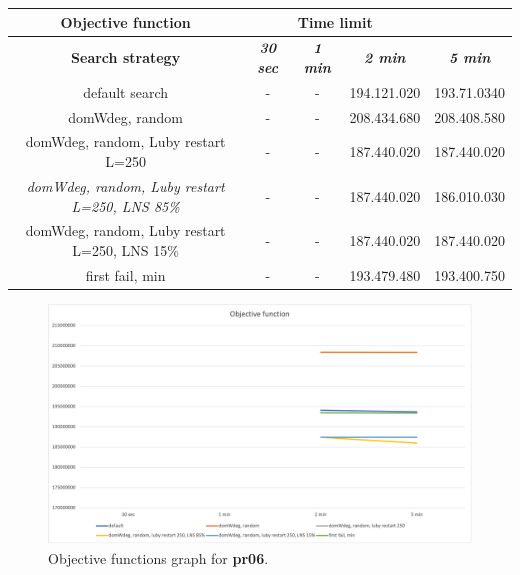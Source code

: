 {
\renewcommand{\arraystretch}{2}
\begin{longtable}[h]{| c | c | c | c | c |}
    \hline
    \textbf{Objective function} & \multicolumn{3}{c}{Time limit} & \\
    \hline
    \textbf{Search strategy} & \textbf{\textit{30 sec}} & \textbf{\textit{1 min}} & \textbf{\textit{2 min}} & \textbf{\textit{5 min}} \\
    \hline
    \endhead
    default search                                         & - & - & 194.121.020 & 193.71.0340 \\
    \hline
    domWdeg, random                                        & - & - & 208.434.680 & 208.408.580 \\
    \hline
    domWdeg, random, Luby restart L=250                    & - & - & 187.440.020 & 187.440.020 \\
    \hline
    \textit{domWdeg, random, Luby restart L=250, LNS 85\%} & - & - & 187.440.020 & 186.010.030 \\
    \hline
    domWdeg, random, Luby restart L=250, LNS 15\%          & - & - & 187.440.020 & 187.440.020 \\
    \hline
    first fail, min                                        & - & - & 193.479.480 & 193.400.750 \\
    \hline
\end{longtable}
}
\begin{figure}[H]
    \centering
    \includegraphics[width=0.8\columnwidth]{../graphs/pr06-objf.png}
    \caption{Objective functions graph for \textbf{pr06}.}
\end{figure}

